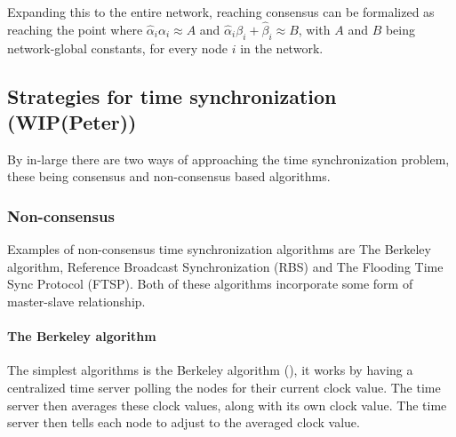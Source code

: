 \documentclass[a4paper,12pt]{article}
\begin{document}
Expanding this to the entire network, reaching consensus can be formalized as reaching the point where $\hat\alpha_i \alpha_i \approx A$ and $\hat\alpha_i \beta_i + \hat\beta_i \approx B$, with $A$ and $B$ being network-global constants, for every node $i$ in the network.


\subsection{Strategies for time synchronization (WIP(Peter))}

By in-large there are two ways of approaching the time synchronization problem, these being consensus and non-consensus based algorithms.

    \subsubsection{Non-consensus}
    Examples of non-consensus time synchronization algorithms are The Berkeley algorithm, Reference Broadcast Synchronization (RBS) and The Flooding Time Sync Protocol (FTSP). Both of these algorithms incorporate some form of master-slave relationship. 
    
    \paragraph{The Berkeley algorithm} The simplest algorithms is the Berkeley algorithm (\cite{Gusella89}), it works by having a centralized time server polling the nodes for their current clock value. The time server then averages these clock values, along with its own clock value. The time server then tells each node to adjust to the averaged clock value. 
    
\end{document}

